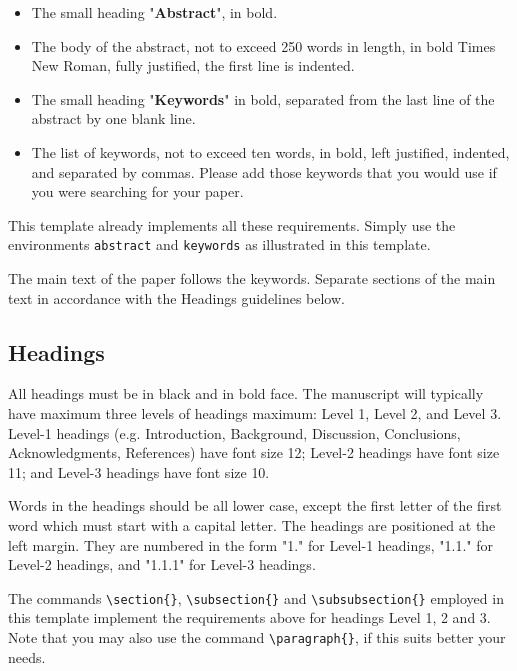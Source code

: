 \documentclass[a4paper, times, 10pt, twocolumn, twoside]{article}
\begin{document}
\begin{itemize}[noitemsep]
\item
The small heading "\textbf{Abstract}", in bold.
\item
The body of the abstract, not to exceed 250 words in length, in bold Times New Roman, fully justified, the first line is indented.
\item
The small heading "\textbf{Keywords}" in bold, separated from the last line of the abstract by one blank line.
\item
The list of keywords, not to exceed ten words, in bold, left justified, indented, and separated by commas. Please add those keywords that you would use if you were searching for your paper.
\end{itemize}
%
This template already implements all these requirements. Simply use the environments \verb|abstract| and \verb|keywords| as illustrated in this template.

The main text of the paper follows the keywords. 
Separate sections of the main text in accordance with the Headings guidelines below.

\subsection{Headings}

All headings must be in black and in bold face. The manuscript will typically have maximum three levels of headings maximum: Level 1, Level 2, and Level 3. Level-1 headings (e.g. Introduction, Background, Discussion, Conclusions, Acknowledgments, References) have font size 12; Level-2 headings have font size 11; and Level-3 headings have font size 10. 

Words in the headings should be all lower case, except the first letter of the first word which must start with a capital letter. The headings are positioned at the left margin. They are numbered in the form "1." for Level-1 headings, "1.1." for Level-2 headings, and "1.1.1" for Level-3 headings.

The commands \verb|\section{}|, \verb|\subsection{}| and \verb|\subsubsection{}| employed in this template implement the requirements above for headings Level 1, 2 and 3.
Note that you may also use the command \verb|\paragraph{}|, if this suits better your needs.
\end{document}
